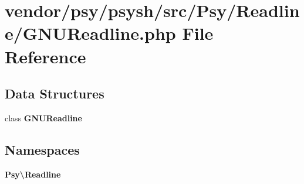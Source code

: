 \section{vendor/psy/psysh/src/\+Psy/\+Readline/\+G\+N\+U\+Readline.php File Reference}
\label{_g_n_u_readline_8php}
\subsection*{Data Structures}
\begin{DoxyCompactItemize}
\item 
class {\bf G\+N\+U\+Readline}
\end{DoxyCompactItemize}
\subsection*{Namespaces}
\begin{DoxyCompactItemize}
\item 
 {\bf Psy\textbackslash{}\+Readline}
\end{DoxyCompactItemize}
